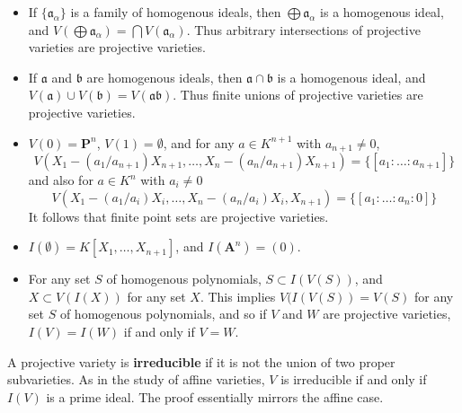 \begin{itemize}
    \item If $\{ \mathfrak{a}_\alpha \}$ is a family of homogenous ideals, then $\bigoplus \mathfrak{a}_\alpha$ is a homogenous ideal, and $V(\bigoplus \mathfrak{a}_\alpha) = \bigcap V(\mathfrak{a}_\alpha)$. Thus arbitrary intersections of projective varieties are projective varieties.

    \item If $\mathfrak{a}$ and $\mathfrak{b}$ are homogenous ideals, then $\mathfrak{a} \cap \mathfrak{b}$ is a homogenous ideal, and $V(\mathfrak{a}) \cup V(\mathfrak{b}) = V(\mathfrak{a}\mathfrak{b})$. Thus finite unions of projective varieties are projective varieties.

    \item $V(0) = \mathbf{P}^n$, $V(1) = \emptyset$, and for any $a \in K^{n+1}$ with $a_{n+1} \neq 0$,
    \[ V(X_1 - (a_1/a_{n+1})X_{n+1}, \dots, X_n - (a_n/a_{n+1})X_{n+1}) = \{ [a_1:\dots:a_{n+1}] \} \]
    and also for $a \in K^n$ with $a_i \neq 0$
    \[ V(X_1 - (a_1/a_i)X_i, \dots, X_n - (a_n/a_i)X_i, X_{n+1}) = \{ [a_1: \dots : a_n: 0] \} \]
    It follows that finite point sets are projective varieties.

    \item $I(\emptyset) = K[X_1, \dots, X_{n+1}]$, and $I(\mathbf{A}^n) = (0)$.

    \item For any set $S$ of homogenous polynomials, $S \subset I(V(S))$, and $X \subset V(I(X))$ for any set $X$. This implies $V(I(V(S)) = V(S)$ for any set $S$ of homogenous polynomials, and so if $V$ and $W$ are projective varieties, $I(V) = I(W)$ if and only if $V = W$.
\end{itemize}

A projective variety is {\bf irreducible} if it is not the union of two proper subvarieties. As in the study of affine varieties, $V$ is irreducible if and only if $I(V)$ is a prime ideal. The proof essentially mirrors the affine case.

